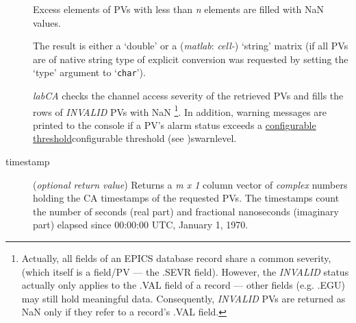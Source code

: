 \documentclass{article}
\newcommand{\sca}{\ita{labCA}}
\newcommand{\matlab}{\ita{matlab}}
\newcommand{\com}[1]{{\tt #1}}
\newcommand{\NAN}{\mbox{NaN}}
\newcommand{\ita}[1]{\emph{#1}}
\newcommand{\n}{$n$}
\newcommand{\mxl}{$m\times 1$}
\renewcommand{\n}{\ita{n}}
\renewcommand{\mxl}{\ita{m x 1}}
\begin{document}
\begin{description}
Excess elements of PVs with less than \n{} elements are filled with
\NAN{} values.

The result is either a `double' or a (\matlab: \ita{cell-}) `string'
matrix (if all PVs are of native string type of explicit conversion
was requested by setting the `type' argument to `\com{char}').

\sca{} checks the channel access severity of the retrieved PVs and
fills the rows of \ita{INVALID} PVs with \NAN%
\footnote{
Actually, all fields of an EPICS database record share a common
severity, (which itself is a field/PV --- the .SEVR field). However,
the \ita{INVALID} status actually only applies to the .VAL field
of a record --- other fields (e.g. .EGU) may still hold meaningful data.
Consequently, \ita{INVALID} PVs are returned as \NAN{} only if
they refer to a record's .VAL field.
}. In addition, warning
messages are printed to the console if a PV's alarm status exceeds
a \hyperref[ref]{configurable threshold}{configurable threshold (see }{ )}{swarnlevel}.
%
%
\item[timestamp] (\ita{optional return value}) Returns a \mxl{}
column vector of \ita{complex} numbers holding the CA timestamps of
the requested PVs. The timestamps count the number of seconds (real part)
and fractional nanoseconds (imaginary part) elapsed since
00:00:00 UTC, January 1, 1970.
\end{description}
\end{document}
